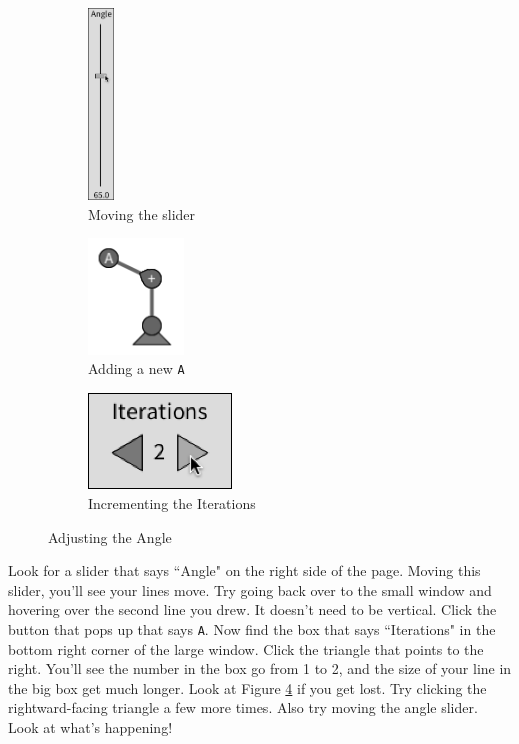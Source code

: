 \documentclass[12pt,twoside]{reedthesis}
\newcommand{\code}[1]{\texttt{#1}}
\begin{document}
	
	\begin{figure}[h]
	\centering
	\begin{subfigure}{0.3\linewidth}
		\centering
		\includegraphics[height = 2in]{Images/HowToExplore2A}
		\caption{Moving the slider}
		\label {HowToExplore2A}
	\end{subfigure}%
	\begin{subfigure}{.3\linewidth}
		\centering
		\includegraphics[width=1in]{Images/HowToExplore2B}
		\caption{Adding a new \code{A}}
		\label {HowToExplore2B}
	\end{subfigure}%
	\begin{subfigure}{.4\linewidth}
		\centering
		\includegraphics[width=1.5in]{Images/HowToExplore2C}
		\caption{Incrementing the Iterations}
		\label {HowToExplore2C}
	\end{subfigure}
	\caption{Adjusting the Angle}
	\label{AdjustingAngle}
	\end{figure}
	
	
	Look for a slider that says ``Angle" on the right side of the page. Moving this slider, you'll see your lines move. Try going back over to the small window and hovering over the second line you drew. It doesn't need to be vertical. Click the button that pops up that says \code{A}. Now find the box that says ``Iterations" in the bottom right corner of the large window. Click the triangle that points to the right. You'll see the number in the box go from 1 to 2, and the size of your line in the big box get much longer. Look at Figure \ref{AdjustingAngle} if you get lost. Try clicking the rightward-facing triangle a few more times. Also try moving the angle slider. Look at what's happening!\\
	
\end{document}
